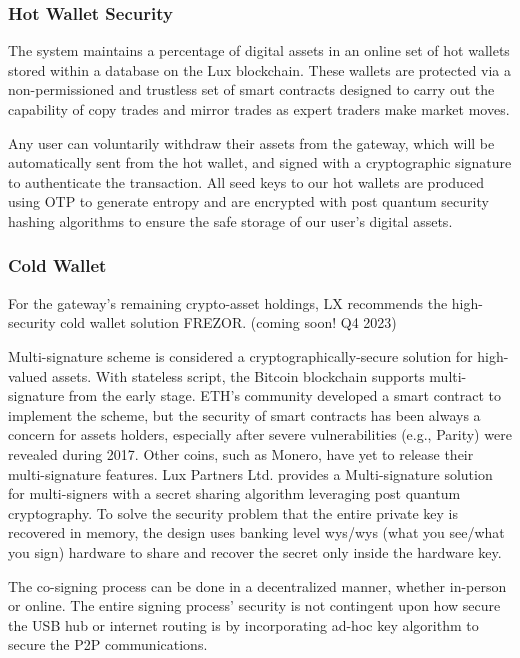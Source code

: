 \documentclass[11pt]{article}
\begin{document}
\subsubsection{Hot Wallet Security}

The system maintains a percentage of digital assets in an online set of hot wallets stored within a database on the Lux  blockchain. These wallets are protected via a non-permissioned and trustless set of smart contracts designed to carry out the capability of copy trades and mirror trades as expert traders make market moves.


Any user can voluntarily withdraw their assets from the gateway, which will be automatically sent from the hot wallet, and signed with a cryptographic signature to authenticate the transaction. All seed keys to our hot wallets are produced using OTP to generate entropy and are encrypted with post quantum security hashing algorithms to ensure the safe storage of our user's digital assets.


\subsubsection{Cold Wallet}

For the gateway's remaining crypto-asset holdings, LX recommends the high-security cold wallet solution FREZOR. (coming soon! Q4 2023)


Multi-signature scheme is considered a cryptographically-secure solution for high-valued assets. With stateless script, the Bitcoin blockchain supports multi-signature from the early stage. ETH's community developed a smart contract to implement the scheme, but the security of smart contracts has been always a concern for assets holders, especially after severe vulnerabilities (e.g., Parity) were revealed during 2017. Other coins, such as Monero, have yet to release their multi-signature features. Lux Partners Ltd. provides a Multi-signature solution for multi-signers with a secret sharing algorithm leveraging post quantum cryptography. To solve the security problem that the entire private key is recovered in memory, the design uses banking level wys/wys (what you see/what you sign) hardware to share and recover the secret only inside the hardware key.


The co-signing process can be done in a decentralized manner, whether in-person or online. The entire signing process' security is not contingent upon how secure the USB hub or internet routing is by incorporating ad-hoc key algorithm to secure the P2P communications.
\end{document}
